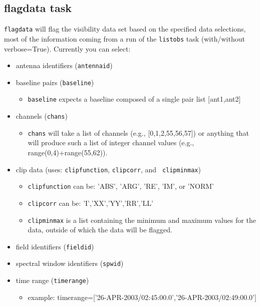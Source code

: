 \subsection{flagdata task}
\label{subsection:flagdata}

{\tt flagdata} will flag the visibility data set based on the
specified data selections, most of the information coming from a run
of the {\tt listobs} task (with/without verbose=True). Currently you can
select: 

\begin{itemize}
   \item antenna identifiers ({\tt antennaid})
   \item baseline pairs ({\tt baseline})
      \begin{itemize}
      \item {\tt baseline} expects a baseline composed of a single pair list [ant1,ant2]
      \end{itemize}
   \item channels ({\tt chans})
      \begin{itemize}
      \item {\tt chans} will take a list of channels (e.g.,
        [0,1,2,55,56,57]) or anything that will produce such a list of
        integer channel values (e.g., range(0,4)+range(55,62)).  
      \end{itemize}
   \item clip data (uses: {\tt clipfunction}, {\tt clipcorr}, and {\tt
      clipminmax})
      \begin{itemize}
      \item {\tt clipfunction} can be: 'ABS', 'ARG', 'RE', 'IM', or 'NORM'
      \item {\tt clipcorr} can be: 'I','XX','YY','RR','LL'
      \item {\tt clipminmax} is a list containing the minimum and
        maximum values for the data, outside of which the data will be
        flagged. 
      \end{itemize}
   \item field identifiers ({\tt fieldid})
   \item spectral window identifiers ({\tt spwid})
   \item time range ({\tt timerange})
      \begin{itemize}
      \item example: timerange=['26-APR-2003/02:45:00.0','26-APR-2003/02:49:00.0']
      \end{itemize}
\end{itemize}

